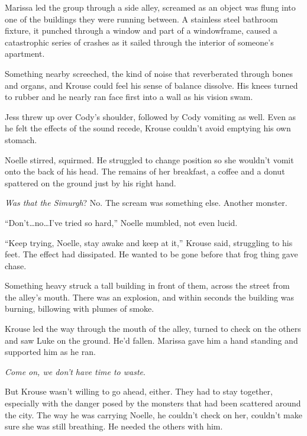 Marissa led the group through a side alley, screamed as an object was flung into one of the buildings they were running between.  A stainless steel bathroom fixture, it punched through a window and part of a windowframe, caused a catastrophic series of crashes as it sailed through the interior of someone's apartment.



Something nearby screeched, the kind of noise that reverberated through bones and organs, and Krouse could feel his sense of balance dissolve.  His knees turned to rubber and he nearly ran face first into a wall as his vision swam.



Jess threw up over Cody's shoulder, followed by Cody vomiting as well.  Even as he felt the effects of the sound recede, Krouse couldn't avoid emptying his own stomach.



Noelle stirred, squirmed.  He struggled to change position so she wouldn't vomit onto the back of his head.  The remains of her breakfast, a coffee and a donut spattered on the ground just by his right hand.



\emph{Was that the Simurgh}?  No.  The scream was something else.  Another monster.



``Don't\ldots no\ldots I've tried so hard,'' Noelle mumbled, not even lucid.



``Keep trying, Noelle, stay awake and keep at it,'' Krouse said, struggling to his feet.  The effect had dissipated.  He wanted to be gone before that frog thing gave chase.



Something heavy struck a tall building in front of them, across the street from the alley's mouth.  There was an explosion, and within seconds the building was burning, billowing with plumes of smoke.



Krouse led the way through the mouth of the alley, turned to check on the others and saw Luke on the ground.  He'd fallen.  Marissa gave him a hand standing and supported him as he ran.



\emph{Come on, we don't have time to waste}.



But Krouse wasn't willing to go ahead, either.  They had to stay together, especially with the danger posed by the monsters that had been scattered around the city.  The way he was carrying Noelle, he couldn't check on her, couldn't make sure she was still breathing.  He needed the others with him.



